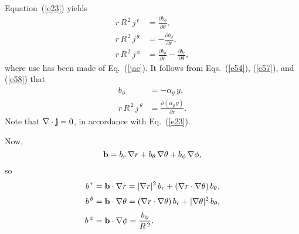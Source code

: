 \documentclass[12pt,prb,aps]{revtex4-1}
\begin{document}
Equation~(\ref{e23}) yields\,\cite{tj}
\begin{align}
r\,R^{\,2}\,j^{\,r} &= \frac{\partial b_\phi}{\partial\theta},\label{e57}\\[0.5ex]
r\,R^{\,2}\,j^{\,\theta} &= -\frac{\partial b_\phi}{\partial r},\label{e58}\\[0.5ex]
r\,R^{\,2}\,j^{\,\phi}&= \frac{\partial b_\theta}{\partial r} -\frac{\partial b_r}{\partial \theta},\label{e59}
\end{align}
where use has been made of Eq.~(\ref{jac}). It follows from Eqs.~(\ref{e54}), (\ref{e57}), and (\ref{e58}) that
\begin{align}\label{e43yy}
b_\phi &=-\alpha_g\,y,\\[0.5ex]
r\,R^{\,2}\,j^{\,\theta}&=  \frac{\partial (\alpha_g\,y)}{\partial r}.\label{e44yy}
\end{align}
Note that $\nabla\cdot{\bf j} = 0$, in accordance with Eq.~(\ref{e23}).

Now, 
\begin{equation}
{\bf b} = b_r\,\nabla r + b_\theta\,\nabla\theta+b_\phi\,\nabla\phi,
\end{equation}
so
\begin{align}
b^{\,r} &= {\bf b}\cdot\nabla r = |\nabla r|^2\,b_r + (\nabla r\cdot\nabla\theta)\,b_\theta,\label{e61}\\[0.5ex]
b^{\,\theta} &= {\bf b}\cdot\nabla \theta = (\nabla r\cdot\nabla\theta)\,b_r + |\nabla\theta|^2\,b_\theta,\label{e62}\\[0.5ex]
b^{\,\phi}&={\bf b}\cdot\nabla\phi =\frac{b_\phi}{R^{\,2}}.\label{e63}
\end{align}
\end{document}
